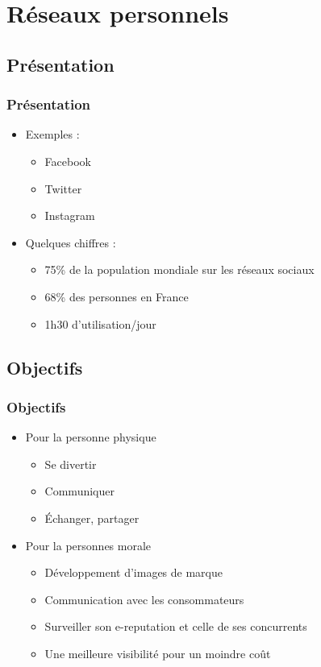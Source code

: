     \section{Réseaux personnels}

\subsection{Présentation}
\begin{frame}
\frametitle{Présentation}
\begin{itemize}
    \itemsep1.5em
    \item Exemples :
        \begin{itemize}
            \itemsep0.5em
            \item Facebook
            \item Twitter
            \item Instagram
        \end{itemize}
    \item Quelques chiffres :
        \begin{itemize}
            \itemsep0.5em
            \item 75\% de la population mondiale sur les réseaux sociaux %
            \item 68\% des personnes en France
            \item 1h30 d'utilisation/jour
        \end{itemize}
\end{itemize}
\end{frame}

\subsection{Objectifs}
\begin{frame}
\frametitle{Objectifs}
\begin{itemize}
    \itemsep1.5em
    \item Pour la personne physique
        \begin{itemize}
            \itemsep0.5em
            \item Se divertir
            \item Communiquer
            \item Échanger, partager
        \end{itemize}
    \item Pour la personnes morale
        \begin{itemize}
            \itemsep0.5em
            \item Développement d'images de marque
            \item Communication avec les consommateurs
            \item Surveiller son e-reputation et celle de ses concurrents
            \item Une meilleure visibilité pour un moindre coût
        \end{itemize}
\end{itemize}
\end{frame}

